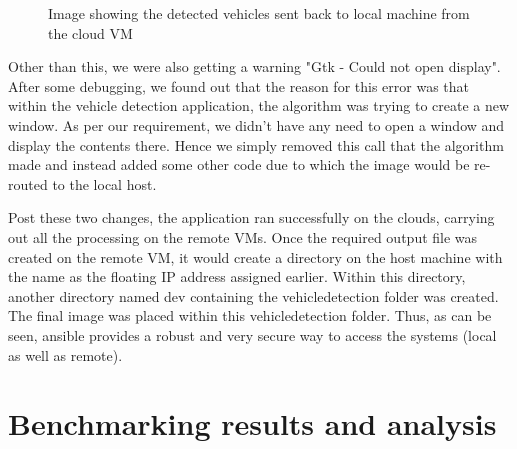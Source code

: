 \documentclass[9pt,twocolumn,twoside]{../../styles/osajnl}
\begin{document}
\begin{figure}[htbp]
  \centering
  \caption{Image showing the detected vehicles sent back to local machine from the cloud VM}
\end{figure}

Other than this, we were also getting a warning "Gtk - Could not open display".  After some debugging, we found out that the reason for this error was that within the vehicle detection application, the algorithm was trying to create a new window.  As per our requirement, we didn't have any need to open a window and display the contents there.  Hence we simply removed this call that the algorithm made and instead added some other code due to which the image would be re-routed to the local host. 

Post these two changes, the application ran successfully on the clouds, carrying out all the processing on the remote VMs.  Once the required output file was created on the remote VM, it would create a directory on the host machine with the name as the floating IP address assigned earlier.  Within this directory, another directory named dev containing the vehicledetection folder was created.  The final image was placed within this vehicledetection folder.  Thus, as can be seen, ansible provides a robust and very secure way to access the systems (local as well as remote).  

\section{Benchmarking results and analysis}
\end{document}
